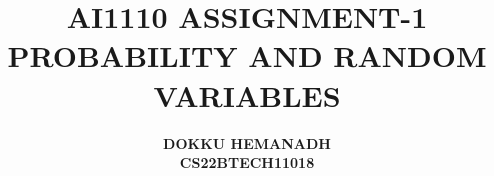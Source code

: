 \documentclass[journal,10pt,twocolumn]{IEEEtran}
\begin{document}
\let\vec\mathbf




\vspace{3cm}

\title{
\textbf{AI1110 ASSIGNMENT-1} \\ \textbf{PROBABILITY AND RANDOM VARIABLES}
}
\author{\textbf{DOKKU HEMANADH\\CS22BTECH11018}}


%
%
%

% 
%
\end{document}
